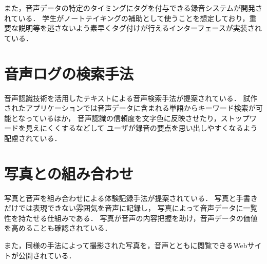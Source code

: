 また，音声データの特定のタイミングにタグを付与できる録音システムが開発されている\cite{Fujisaka}．
学生がノートテイキングの補助として使うことを想定しており，重要な説明等を逃さないよう素早くタグ付けが行えるインターフェースが実装されている．

\section{音声ログの検索手法}

音声認識技術を活用したテキストによる音声検索手法が提案されている\cite{Vemuri}．
試作されたアプリケーションでは音声データに含まれる単語からキーワード検索が可能となっているほか，
音声認識の信頼度を文字色に反映させたり，ストップワードを見えにくくするなどして
ユーザが録音の要点を思い出しやすくなるよう配慮されている．

\section{写真との組み合わせ}
写真と音声を組み合わせによる体験記録手法が提案されている\cite{Nakakura}．
写真と手書きだけでは表現できない雰囲気を音声に記録し，
写真によって音声データに一覧性を持たせる仕組みである．
写真が音声の内容把握を助け，音声データの価値を高めることも確認されている．

また，同様の手法によって撮影された写真を，音声とともに閲覧できるWebサイトが公開されている\cite{Masui}．

